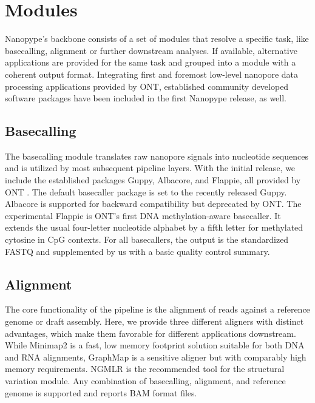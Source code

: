 \section{Modules}
\label{sec:nanopype:modules}
Nanopype’s backbone consists of a set of modules that resolve a specific task, like basecalling, alignment or further downstream analyses. If available, alternative applications are provided for the same task and grouped into a module with a coherent output format. Integrating first and foremost low-level nanopore data processing applications provided by ONT, established community developed software packages have been included in the first Nanopype release, as well.


\subsection{Basecalling}
\label{subsec:nanopype:basecalling}
The basecalling module translates raw nanopore signals into nucleotide sequences and is utilized by most subsequent pipeline layers. With the initial release, we include the established packages Guppy, Albacore, and Flappie, all provided by ONT \cite{Wick2019}. The default basecaller package is set to the recently released Guppy. Albacore is supported for backward compatibility but deprecated by ONT. The experimental Flappie is ONT’s first DNA methylation-aware basecaller. It extends the usual four-letter nucleotide alphabet by a fifth letter for methylated cytosine in CpG contexts. For all basecallers, the output is the standardized FASTQ and supplemented by us with a basic quality control summary.


\subsection{Alignment}
\label{subsec:nanopype:alignment}
The core functionality of the pipeline is the alignment of reads against a reference genome or draft assembly. Here, we provide three different aligners with distinct advantages, which make them favorable for different applications downstream. While Minimap2 \cite{Li2018} is a fast, low memory footprint solution suitable for both DNA and RNA alignments, GraphMap \cite{Sovic2016} is a sensitive aligner but with comparably high memory requirements. NGMLR \cite{Sedlazeck2018} is the recommended tool for the structural variation module. Any combination of basecalling, alignment, and reference genome is supported and reports BAM format files.



